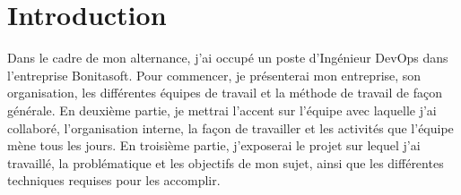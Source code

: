 \documentclass[12pt]{article}
\begin{document}
\newpage
\setcounter{tocdepth}{2}
\tableofcontents
\newpage

\section{Introduction}
Dans le cadre de mon alternance, j'ai occupé un poste d'Ingénieur DevOps dans l'entreprise Bonitasoft.
Pour commencer, je présenterai mon entreprise, son organisation, les différentes équipes de travail et la méthode de travail de façon générale.
En deuxième partie, je mettrai l’accent sur l'équipe avec laquelle j'ai collaboré, l'organisation interne, la façon de travailler et les activités que l'équipe mène tous les jours.
En troisième partie, j'exposerai le projet sur lequel j'ai travaillé, la problématique et les objectifs de mon sujet, ainsi que les différentes techniques requises pour les accomplir.










\newpage
{}

\newpage


\newpage


\end{document}
